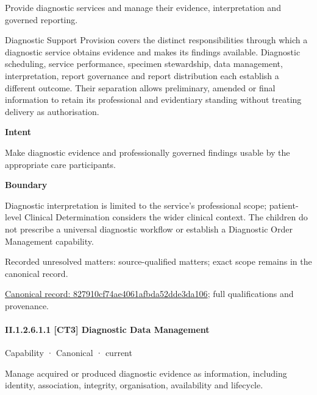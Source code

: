 Provide diagnostic services and manage their evidence, interpretation and governed reporting.



Diagnostic Support Provision covers the distinct responsibilities through which a diagnostic service obtains evidence and makes its findings available. Diagnostic scheduling, service performance, specimen stewardship, data management, interpretation, report governance and report distribution each establish a different outcome. Their separation allows preliminary, amended or final information to retain its professional and evidentiary standing without treating delivery as authorisation.



\textbf{Intent}



Make diagnostic evidence and professionally governed findings usable by the appropriate care participants.



\textbf{Boundary}



Diagnostic interpretation is limited to the service's professional scope; patient-level Clinical Determination considers the wider clinical context. The children do not prescribe a universal diagnostic workflow or establish a Diagnostic Order Management capability.


{\small Recorded unresolved matters: source-qualified matters; exact scope remains in the canonical record.}\par
{\footnotesize \href{../../../../../../../continuum/strategy/capability/827910cf74ae4061afbda52dde3da106.md}{Canonical record: 827910cf74ae4061afbda52dde3da106}; full qualifications and provenance.}\par
\paragraph*{II.1.2.6.1.1 [CT3] Diagnostic Data Management}
\label{navigation:II.1.2.6.1.1}

\label{element:aeb8e6d2225a4df38e61ae116850b32c}
{\small Capability · Canonical · current}\par

Manage acquired or produced diagnostic evidence as information, including identity, association, integrity, organisation, availability and lifecycle.



